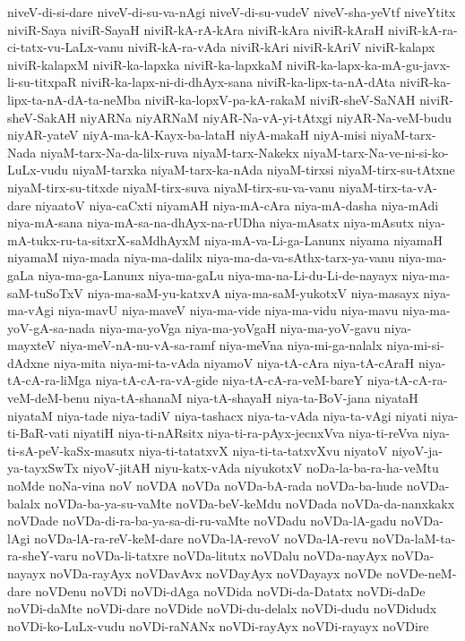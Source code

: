 {niveV-di-si-dare
niveV-di-su-va-nAgi
niveV-di-su-vudeV
niveV-sha-yeVtf
niveYtitx
niviR-Saya
niviR-SayaH
niviR-kA-rA-kAra
niviR-kAra
niviR-kAraH
niviR-kA-ra-ci-tatx-vu-LaLx-vanu
niviR-kA-ra-vAda
niviR-kAri
niviR-kAriV
niviR-kalapx
niviR-kalapxM
niviR-ka-lapxka
niviR-ka-lapxkaM
niviR-ka-lapx-ka-mA-gu-javx-li-su-titxpaR
niviR-ka-lapx-ni-di-dhAyx-sana
niviR-ka-lipx-ta-nA-dAta
niviR-ka-lipx-ta-nA-dA-ta-neMba
niviR-ka-lopxV-pa-kA-rakaM
niviR-sheV-SaNAH
niviR-sheV-SakAH
niyARNa
niyARNaM
niyAR-Na-vA-yi-tAtxgi
niyAR-Na-veM-budu
niyAR-yateV
niyA-ma-kA-Kayx-ba-lataH
niyA-makaH
niyA-misi
niyaM-tarx-Nada
niyaM-tarx-Na-da-lilx-ruva
niyaM-tarx-Nakekx
niyaM-tarx-Na-ve-ni-si-ko-LuLx-vudu
niyaM-tarxka
niyaM-tarx-ka-nAda
niyaM-tirxsi
niyaM-tirx-su-tAtxne
niyaM-tirx-su-titxde
niyaM-tirx-suva
niyaM-tirx-su-va-vanu
niyaM-tirx-ta-vA-dare
niyaatoV
niya-caCxti
niyamAH
niya-mA-cAra
niya-mA-dasha
niya-mAdi
niya-mA-sana
niya-mA-sa-na-dhAyx-na-rUDha
niya-mAsatx
niya-mAsutx
niya-mA-tukx-ru-ta-sitxrX-saMdhAyxM
niya-mA-va-Li-ga-Lanunx
niyama
niyamaH
niyamaM
niya-mada
niya-ma-dalilx
niya-ma-da-va-sAthx-tarx-ya-vanu
niya-ma-gaLa
niya-ma-ga-Lanunx
niya-ma-gaLu
niya-ma-na-Li-du-Li-de-nayayx
niya-ma-saM-tuSoTxV
niya-ma-saM-yu-katxvA
niya-ma-saM-yukotxV
niya-masayx
niya-ma-vAgi
niya-mavU
niya-maveV
niya-ma-vide
niya-ma-vidu
niya-mavu
niya-ma-yoV-gA-sa-nada
niya-ma-yoVga
niya-ma-yoVgaH
niya-ma-yoV-gavu
niya-mayxteV
niya-meV-nA-nu-vA-sa-ramf
niya-meVna
niya-mi-ga-nalalx
niya-mi-si-dAdxne
niya-mita
niya-mi-ta-vAda
niyamoV
niya-tA-cAra
niya-tA-cAraH
niya-tA-cA-ra-liMga
niya-tA-cA-ra-vA-gide
niya-tA-cA-ra-veM-bareY
niya-tA-cA-ra-veM-deM-benu
niya-tA-shanaM
niya-tA-shayaH
niya-ta-BoV-jana
niyataH
niyataM
niya-tade
niya-tadiV
niya-tashacx
niya-ta-vAda
niya-ta-vAgi
niyati
niya-ti-BaR-vati
niyatiH
niya-ti-nARsitx
niya-ti-ra-pAyx-jecnxVva
niya-ti-reVva
niya-ti-sA-peV-kaSx-masutx
niya-ti-tatatxvX
niya-ti-ta-tatxvXvu
niyatoV
niyoV-ja-ya-tayxSwTx
niyoV-jitAH
niyu-katx-vAda
niyukotxV
noDa-la-ba-ra-ha-veMtu
noMde
noNa-vina
noV
noVDA
noVDa
noVDa-bA-rada
noVDa-ba-hude
noVDa-balalx
noVDa-ba-ya-su-vaMte
noVDa-beV-keMdu
noVDada
noVDa-da-nanxkakx
noVDade
noVDa-di-ra-ba-ya-sa-di-ru-vaMte
noVDadu
noVDa-lA-gadu
noVDa-lAgi
noVDa-lA-ra-reV-keM-dare
noVDa-lA-revoV
noVDa-lA-revu
noVDa-laM-ta-ra-sheY-varu
noVDa-li-tatxre
noVDa-litutx
noVDalu
noVDa-nayAyx
noVDa-nayayx
noVDa-rayAyx
noVDavAvx
noVDayAyx
noVDayayx
noVDe
noVDe-neM-dare
noVDenu
noVDi
noVDi-dAga
noVDida
noVDi-da-Datatx
noVDi-daDe
noVDi-daMte
noVDi-dare
noVDide
noVDi-du-delalx
noVDi-dudu
noVDidudx
noVDi-ko-LuLx-vudu
noVDi-raNANx
noVDi-rayAyx
noVDi-rayayx
noVDire
}

